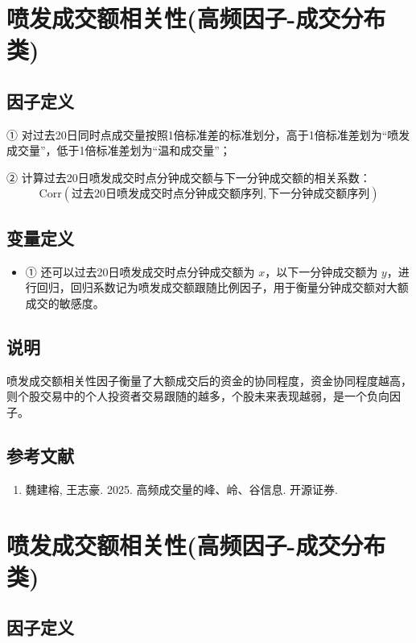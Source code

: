 \documentclass{article}
\begin{document}
\section{喷发成交额相关性(高频因子-成交分布类)}

\subsection{因子定义}

① 对过去20日同时点成交量按照1倍标准差的标准划分，高于1倍标准差划为“喷发成交量”，低于1倍标准差划为“温和成交量”；

② 计算过去20日喷发成交时点分钟成交额与下一分钟成交额的相关系数：
\begin{equation}
    \mathrm{Corr}(\text{过去20日喷发成交时点分钟成交额序列}, \text{下一分钟成交额序列})
\end{equation}

\subsection{变量定义}
\begin{itemize}
    \item ① 还可以过去20日喷发成交时点分钟成交额为 \( x \)，以下一分钟成交额为 \( y \)，进行回归，回归系数记为喷发成交额跟随比例因子，用于衡量分钟成交额对大额成交的敏感度。
\end{itemize}

\subsection{说明}
喷发成交额相关性因子衡量了大额成交后的资金的协同程度，资金协同程度越高，则个股交易中的个人投资者交易跟随的越多，个股未来表现越弱，是一个负向因子。

\subsection{参考文献}
\begin{enumerate}
    \item 魏建榕, 王志豪. 2025. 高频成交量的峰、岭、谷信息. 开源证券.
\end{enumerate}

\section{喷发成交额相关性(高频因子-成交分布类)}

\subsection{因子定义}
\end{document}
